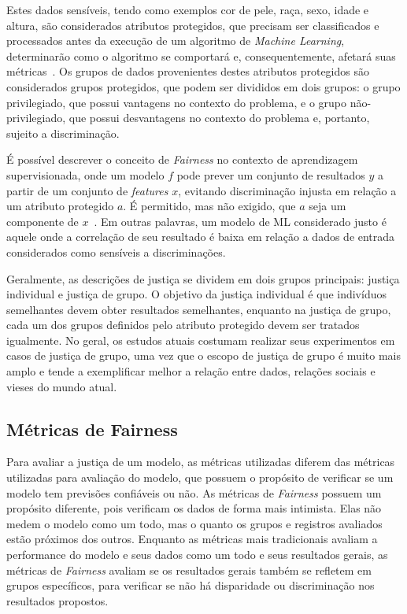 \documentclass[portugues]{ic-tese}
\begin{document}
Estes dados sensíveis, tendo como exemplos cor de pele, raça, sexo, idade e altura, são considerados atributos protegidos, que precisam ser classificados e processados antes da execução de um algoritmo de \textit{Machine Learning}, determinarão como o algoritmo se comportará e, consequentemente, afetará suas métricas~\citep{Mougan_2022}. Os grupos de dados provenientes destes atributos protegidos são considerados grupos protegidos, que podem ser divididos em dois grupos: o grupo privilegiado, que possui vantagens no contexto do problema, e o grupo não-privilegiado, que possui desvantagens no contexto do problema e, portanto, sujeito a discriminação.

É possível descrever o conceito de \textit{Fairness} no contexto de aprendizagem supervisionada, onde um modelo $f$ pode prever um conjunto de resultados $y$ a partir de um conjunto de \textit{features} $x$, evitando discriminação injusta em relação a um atributo protegido $a$. É permitido, mas não exigido, que $a$ seja um componente de $x$~\citep{Begley_2021}. Em outras palavras, um modelo de ML considerado justo é aquele onde a correlação de seu resultado é baixa em relação a dados de entrada considerados como sensíveis a discriminações.

Geralmente, as descrições de justiça se dividem em dois grupos principais: justiça individual e justiça de grupo. O objetivo da justiça individual é que indivíduos semelhantes devem obter resultados semelhantes, enquanto na justiça de grupo, cada um dos grupos definidos pelo atributo protegido devem ser tratados igualmente. No geral, os estudos atuais costumam realizar seus experimentos em casos de justiça de grupo, uma vez que o escopo de justiça de grupo é muito mais amplo e tende a exemplificar melhor a relação entre dados, relações sociais e vieses do mundo atual.

\subsection{Métricas de Fairness}
\label{sec:FairnessMetrics}

Para avaliar a justiça de um modelo, as métricas utilizadas diferem das métricas utilizadas para avaliação do modelo, que possuem o propósito de verificar se um modelo tem previsões confiáveis ou não. As métricas de \textit{Fairness} possuem um propósito diferente, pois verificam os dados de forma mais intimista. Elas não medem o modelo como um todo, mas o quanto os grupos e registros avaliados estão próximos dos outros. Enquanto as métricas mais tradicionais avaliam a performance do modelo e seus dados como um todo e seus resultados gerais, as métricas de \textit{Fairness} avaliam se os resultados gerais também se refletem em grupos específicos, para verificar se não há disparidade ou discriminação nos resultados propostos.
\end{document}
